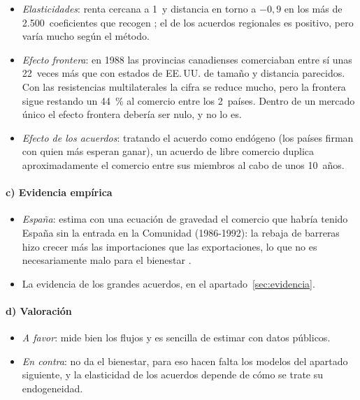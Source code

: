 \documentclass[11pt]{article}
\begin{document}
\begin{itemize}
\item \emph{Elasticidades}: renta cercana a 1~y distancia en torno a $-0{,}9$ en los más de 2.500~coeficientes que recogen \textcite{HeadMayer2014}; el de los acuerdos regionales es positivo, pero varía mucho según el método.
\item \emph{Efecto frontera}: en 1988 las provincias canadienses comerciaban entre sí unas 22~veces más que con estados de EE.\,UU. de tamaño y distancia parecidos\nocite{McCallum1995}. Con las resistencias multilaterales la cifra se reduce mucho, pero la frontera sigue restando un 44~\% al comercio entre los 2~países\nocite{AndersonVanWincoop2003}. Dentro de un mercado único el efecto frontera debería ser nulo, y no lo es.
\item \emph{Efecto de los acuerdos}: tratando el acuerdo como endógeno (los países firman con quien más esperan ganar), un acuerdo de libre comercio duplica aproximadamente el comercio entre sus miembros al cabo de unos 10~años\nocite{BaierBergstrand2007}.
\end{itemize}

\paragraph{c) Evidencia empírica}

\begin{itemize}
\item \emph{España}: \textcite{Sanz2000Kalman} estima con una ecuación de gravedad el comercio que habría tenido España sin la entrada en la Comunidad (1986-1992): la rebaja de barreras hizo crecer más las importaciones que las exportaciones, lo que no es necesariamente malo para el bienestar .
\item La evidencia de los grandes acuerdos, en el apartado~\ref{sec:evidencia}.
\end{itemize}

\paragraph{d) Valoración}

\begin{itemize}
\item \emph{A favor}: mide bien los flujos y es sencilla de estimar con datos públicos.
\item \emph{En contra}: no da el bienestar, para eso hacen falta los modelos del apartado siguiente, y la elasticidad de los acuerdos depende de cómo se trate su endogeneidad.
\end{itemize}
\end{document}
